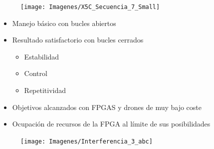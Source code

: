 \documentclass[a4,landscpae]{seminar}
\begin{document}
\begin{hslide}
\begin{center}
	\begin{figure}
		\texttt{[image: Imagenes/X5C\_Secuencia\_7\_Small]}
	\end{figure} \hfill
\end{center}
\end{hslide}



\begin{hslide}
\begin{minipage}{8cm}
	\begin{itemize}
		\item Manejo b\'asico con bucles abiertos
		\item Resultado satisfactorio con bucles cerrados
			\begin{itemize}
				\item Estabilidad
				\item Control
				\item Repetitividad
			\end{itemize}
		\item Objetivos alcanzados con FPGAS y drones de muy bajo coste
		\item Ocupaci\'on de recursos de la FPGA al l\'imite de sus posibilidades
	\end{itemize}
\end{minipage} \hfill
\begin{minipage}{2cm}
	\begin{center}
		\begin{figure}
			\texttt{[image: Imagenes/Interferencia\_3\_abc]}
		\end{figure}
	\end{center}
\end{minipage} \hfill
\end{hslide}
\end{document}
